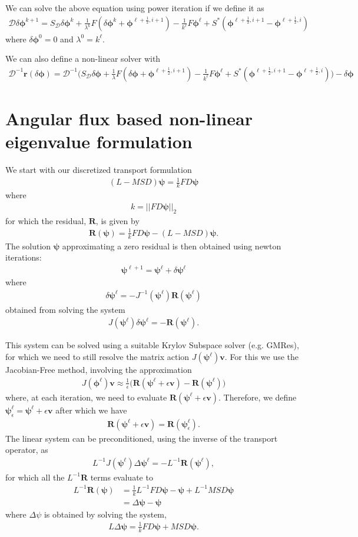 \documentclass[11pt,letterpaper,notitlepage]{article}
\newcommand{\beqn}{\begin{equation}
		\begin{aligned}}
\newcommand{\eeqn}{\end{aligned}
\end{equation}}
\numberwithin{equation}{section}
\newcommand{\Linv}{L^{-1}}
\newcommand{\bphi}{\boldsymbol{\phi}}
\newcommand{\bpsi}{\boldsymbol{\psi}}
\newcommand{\bR}{\mathbf{R}}
\newcommand{\half}{\frac{1}{2}}
\begin{document}
We can solve the above equation using power iteration if we define it as
\beqn 
\mathcal{D} \delta \bphi^{k+1} = S_{\mathcal{D}} \delta \bphi^k + \frac{1}{\lambda^k}F(\delta \bphi^k + \bphi^{\ell+\half,i+1}) - \frac{1}{k^\ell} F\bphi^\ell + S^*(\bphi^{\ell+\half,i+1} - \bphi^{\ell+\half,i})
\eeqn 
where $\delta \bphi^0 = 0$ and $\lambda^0 = k^\ell$.


We can also define a non-linear solver with
\beqn 
\mathcal{D}^{-1} \mathbf{r}(\delta \bphi) = \mathcal{D}^{-1}
\biggr(
S_{\mathcal{D}} \delta \bphi
+ \frac{1}{\lambda}F(\delta \bphi + \bphi^{\ell+\half,i+1}) 
- \frac{1}{k^\ell} F\bphi^\ell 
+ S^*(\bphi^{\ell+\half,i+1} - \bphi^{\ell+\half,i})
\biggr) - \delta \bphi
\eeqn 






\newpage
{}
\section{Angular flux based non-linear eigenvalue formulation}
We start with our discretized transport formulation
\beqn 
(L - MSD)\bpsi = \frac{1}{k} FD\bpsi
\eeqn 
where
\beqn 
k = ||FD\bpsi ||_2
\eeqn 
for which the residual, $\bR$, is given by
\beqn 
\bR(\bpsi) = \frac{1}{k} FD\bpsi - (L - MSD)\bpsi.
\eeqn 
The solution $\bpsi$ approximating a zero residual is then obtained using newton iterations:
\beqn 
\bpsi^{\ell+1} = \bpsi^\ell + \delta \bpsi^\ell
\eeqn 
where
\beqn 
\delta \bpsi^\ell = -J^{-1}(\bpsi^\ell) \bR(\bpsi^\ell)
\eeqn 
obtained from solving the system
\beqn 
J(\bpsi^{\ell}) \delta \bpsi^{\ell} = -\bR(\bpsi^{\ell}).
\eeqn 

This system can be solved using a suitable Krylov Subspace solver (e.g. GMRes), for which we need to still resolve the matrix action $J(\bpsi^{\ell})\mathbf{v}$. For this we use the Jacobian-Free method, involving the approximation 
\beqn 
J(\bphi^{\ell})\mathbf{v} \approx \frac{1}{\epsilon} \biggr(\bR(\bpsi^\ell + \epsilon \mathbf{v}) - \bR(\bpsi^\ell)\biggr)
\eeqn 
where, at each iteration, we need to evaluate $\bR(\bpsi^\ell + \epsilon \mathbf{v})$. Therefore, we define $\bpsi_\epsilon^\ell = \bpsi^\ell + \epsilon \mathbf{v}$ after which we have
\beqn 
\bR(\bpsi^\ell + \epsilon \mathbf{v}) = \bR(\bpsi_\epsilon^\ell).
\eeqn 
\newline
\newline
The linear system can be preconditioned, using the inverse of the transport operator, as
\beqn 
\Linv J(\bpsi^{\ell}) \Delta \bpsi^{\ell} = -\Linv \bR(\bpsi^{\ell}),
\eeqn 
for which all the $\Linv \bR$ terms evaluate to
\beqn
\Linv \bR(\bpsi) &= \frac{1}{k} \Linv FD\bpsi - \bpsi + \Linv MSD\bpsi \\
&= \Delta \bpsi - \bpsi
\eeqn 
where $\Delta \psi$ is obtained by solving the system,
\beqn 
L\Delta \bpsi = \frac{1}{k} FD\bpsi + MSD\bpsi.
\eeqn 
\end{document}
